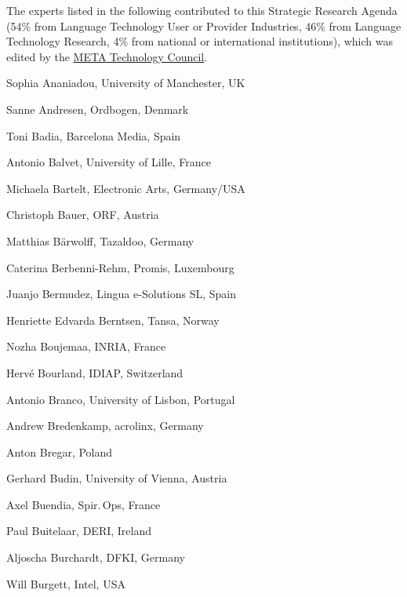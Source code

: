 \documentclass[10pt, plain]{../../metanetpaper}
\begin{document}
\label{sec:list-of-contributors}

The experts listed in the following contributed to this Strategic Research Agenda (54\% from Language Technology User or Provider Industries, 46\% from Language Technology Research, 4\% from national or international institutions), which was edited by the \href{http://www.meta-net.eu/vision/technology-council-members/all}{META Technology Council}.

%

\begin{multicols}{3}
\begin{small}
  \begin{enumerate}
    \raggedright{
      \item Sophia Ananiadou, University of Manchester, UK
      \item Sanne Andresen, Ordbogen, Denmark
      \item Toni Badia, Barcelona Media, Spain
      \item Antonio Balvet, University of Lille, France
      \item Michaela Bartelt, Electronic Arts, Germany/USA
      \item Christoph Bauer, ORF, Austria
      \item Matthias Bärwolff, Tazaldoo, Germany
      \item Caterina Berbenni-Rehm, Promis, Luxembourg
      \item Juanjo Bermudez, Lingua e-Solutions SL, Spain
      \item Henriette Edvarda Berntsen, Tansa, Norway
      \item Nozha Boujemaa, INRIA, France
      \item Hervé Bourland, IDIAP, Switzerland
      \item Antonio Branco, University of Lisbon, Portugal
      \item Andrew Bredenkamp, acrolinx, Germany
      \item Anton Bregar, Poland
      \item Gerhard Budin, University of Vienna, Austria
      \item Axel Buendia, Spir.\,Ops, France
      \item Paul Buitelaar, DERI, Ireland
      \item Aljoscha Burchardt, DFKI, Germany
      \item Will Burgett, Intel, USA
}
\end{enumerate}
\end{small}
\end{multicols}
\end{document}
